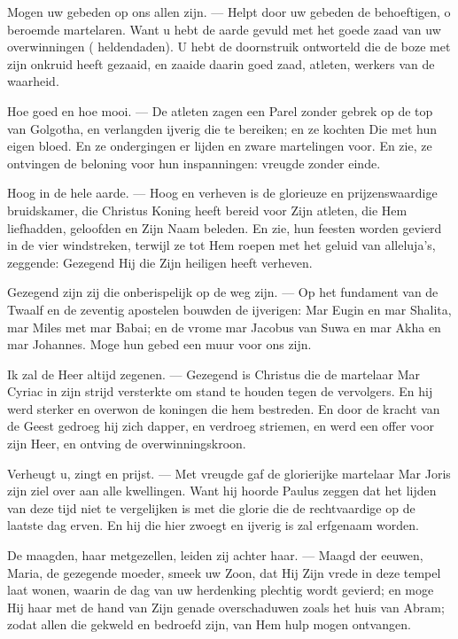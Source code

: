 \documentclass[12pt,twoside,a5paper]{article}
\begin{document}
\begin{halfparskip}
  Mogen uw gebeden op ons allen zijn. --- Helpt door uw gebeden de behoeftigen, o beroemde martelaren. Want u hebt de aarde gevuld met het goede zaad van uw overwinningen ( heldendaden). U hebt de doornstruik ontworteld die de boze met zijn onkruid heeft gezaaid, en zaaide daarin goed zaad, atleten, werkers van de waarheid.

  Hoe goed en hoe mooi. --- De atleten zagen een Parel zonder gebrek op de top van Golgotha, en verlangden ijverig die te bereiken; en ze kochten Die met hun eigen bloed. En ze ondergingen er lijden en zware martelingen voor. En zie, ze ontvingen de beloning voor hun inspanningen: vreugde zonder einde.

  Hoog in de hele aarde. --- Hoog en verheven is de glorieuze en prijzenswaardige bruidskamer, die Christus Koning heeft bereid voor Zijn atleten, die Hem liefhadden, geloofden en Zijn Naam beleden. En zie, hun feesten worden gevierd in de vier windstreken, terwijl ze tot Hem roepen met het geluid van alleluja's, zeggende: Gezegend Hij die Zijn heiligen heeft verheven.

  Gezegend zijn zij die onberispelijk op de weg zijn. --- Op het fundament van de Twaalf en de zeventig apostelen bouwden de ijverigen: Mar Eugin en mar Shalita, mar Miles met mar Babai; en de vrome mar Jacobus van Suwa en mar Akha en mar Johannes. Moge hun gebed een muur voor ons zijn.

  Ik zal de Heer altijd zegenen. --- Gezegend is Christus die de martelaar Mar Cyriac in zijn strijd versterkte om stand te houden tegen de vervolgers. En hij werd sterker en overwon de koningen die hem bestreden. En door de kracht van de Geest gedroeg hij zich dapper, en verdroeg striemen, en werd een offer voor zijn Heer, en ontving de overwinningskroon.

  Verheugt u, zingt en prijst. --- Met vreugde gaf de glorierijke martelaar Mar Joris zijn ziel over aan alle kwellingen. Want hij hoorde Paulus zeggen dat het lijden van deze tijd niet te vergelijken is met die glorie die de rechtvaardige op de laatste dag erven. En hij die hier zwoegt en ijverig is zal erfgenaam worden.

  De maagden, haar metgezellen, leiden zij achter haar. --- Maagd der eeuwen, Maria, de gezegende moeder, smeek uw Zoon, dat Hij Zijn vrede in deze tempel laat wonen, waarin de dag van uw herdenking plechtig wordt gevierd; en moge Hij haar met de hand van Zijn genade overschaduwen zoals het huis van Abram; zodat allen die gekweld en bedroefd zijn, van Hem hulp mogen ontvangen.


\end{halfparskip}
\end{document}
